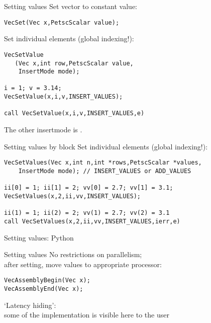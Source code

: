 \begin{numberedframe}{Setting values}
\small
Set vector to constant value:
\begin{lstlisting}
VecSet(Vec x,PetscScalar value);
\end{lstlisting}
Set individual elements (global indexing!):
\lstset{language=Fortran}
\begin{lstlisting}
VecSetValue
   (Vec x,int row,PetscScalar value,
    InsertMode mode);

i = 1; v = 3.14;
VecSetValue(x,i,v,INSERT_VALUES);

call VecSetValue(x,i,v,INSERT_VALUES,e)
\end{lstlisting}
The other insertmode is .
\end{numberedframe}

\lstset{language=C}

\begin{numberedframe}{Setting values by block}
Set individual elements (global indexing!):
\begin{lstlisting}
VecSetValues(Vec x,int n,int *rows,PetscScalar *values,
    InsertMode mode); // INSERT_VALUES or ADD_VALUES

ii[0] = 1; ii[1] = 2; vv[0] = 2.7; vv[1] = 3.1;
VecSetValues(x,2,ii,vv,INSERT_VALUES);

ii(1) = 1; ii(2) = 2; vv(1) = 2.7; vv(2) = 3.1
call VecSetValues(x,2,ii,vv,INSERT_VALUES,ierr,e)
\end{lstlisting}
\end{numberedframe}

\begin{python}
\begin{numberedframe}{Setting values: Python}
\end{numberedframe}
\end{python}

\begin{numberedframe}{Setting values}
No restrictions on parallelism;\\
after setting, move values to appropriate processor:
\begin{lstlisting}
VecAssemblyBegin(Vec x);
VecAssemblyEnd(Vec x);
\end{lstlisting}
`Latency hiding':\\
some of the implementation is visible here
to the user
\end{numberedframe}

